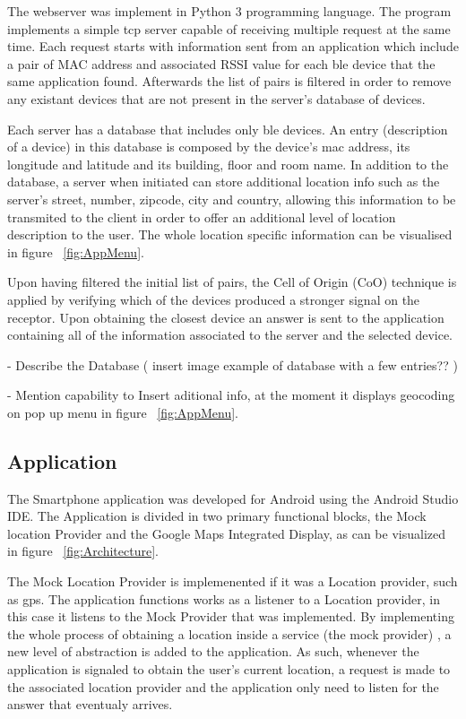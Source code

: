 \documentclass[a4paper]{IEEEtran}
\begin{document}
The webserver was implement in Python 3 programming language. The program implements a simple tcp server capable of receiving multiple request at the same time. Each request starts with information sent from an application which include a pair of MAC address and associated RSSI value for each ble device that the same application found. Afterwards the list of pairs is filtered in order to remove any existant devices that are not present in the server's database of devices.

Each server has a database that includes only ble devices. An entry (description of a device) in this database is composed by the device's mac address, its longitude and latitude and its building, floor and room name. In addition to the database, a server when initiated can store additional location info such as the server's street, number, zipcode, city and country, allowing this information to be transmited to the client in order to offer an additional level of location description to the user. The whole location specific information can be visualised in figure ~\ref{fig:AppMenu}.

Upon having filtered the initial list of pairs, the Cell of Origin (CoO) technique is applied by verifying which of the devices produced a stronger signal on the receptor. Upon obtaining the closest device an answer is sent to the application containing all of the information associated to the server and the selected device.


- Describe the Database ( insert image example of database with a few entries?? )

- Mention capability to Insert aditional info, at the moment it displays geocoding on pop up menu in figure ~\ref{fig:AppMenu}.



\subsection{ Application}
\label{subsec:app}

The Smartphone application was developed for Android using the Android Studio IDE. The Application is divided in two primary functional blocks, the Mock location Provider and the Google Maps Integrated Display, as can be visualized in figure ~\ref{fig:Architecture}.

The Mock Location Provider is implemenented if it was a Location provider, such as gps. The application functions works as a listener to a Location provider, in this case it listens to the Mock Provider that was implemented. By implementing the whole process of obtaining a location inside a service (the mock provider) , a new level of abstraction is added to the application. As such, whenever the application is signaled to obtain the user's current location, a request is made to the associated location provider and the application only need to listen for the answer that eventualy arrives.
\end{document}
